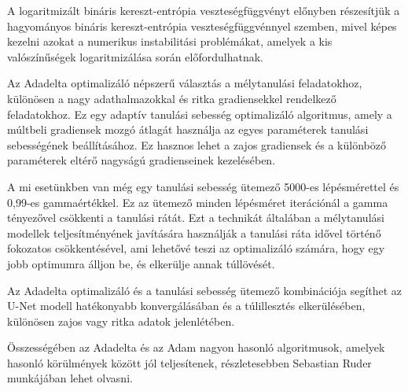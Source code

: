 \documentclass[12pt,a4]{article}
\begin{document}
        A logaritmizált bináris kereszt-entrópia veszteségfüggvényt előnyben részesítjük a hagyományos bináris kereszt-entrópia veszteségfüggvénnyel szemben, mivel képes kezelni azokat a numerikus instabilitási problémákat, amelyek a kis valószínűségek logaritmizálása során előfordulhatnak.

        Az Adadelta optimalizáló népszerű választás a mélytanulási feladatokhoz, különösen a nagy adathalmazokkal és ritka gradiensekkel rendelkező feladatokhoz. Ez egy adaptív tanulási sebesség optimalizáló algoritmus, amely a múltbeli gradiensek mozgó átlagát használja az egyes paraméterek tanulási sebességének beállításához. Ez hasznos lehet a zajos gradiensek és a különböző paraméterek eltérő nagyságú gradienseinek kezelésében.

        A mi esetünkben van még egy tanulási sebesség ütemező 5000-es lépésmérettel és 0,99-es gammaértékkel. Ez az ütemező minden lépésméret iterációnál a gamma tényezővel csökkenti a tanulási rátát. Ezt a technikát általában a mélytanulási modellek teljesítményének javítására használják a tanulási ráta idővel történő fokozatos csökkentésével, ami lehetővé teszi az optimalizáló számára, hogy egy jobb optimumra álljon be, és elkerülje annak túllövését.

        Az Adadelta optimalizáló és a tanulási sebesség ütemező kombinációja segíthet az U-Net modell hatékonyabb konvergálásában és a túlillesztés elkerülésében, különösen zajos vagy ritka adatok jelenlétében.
        
        Összességében az Adadelta és az Adam nagyon hasonló algoritmusok, amelyek hasonló körülmények között jól teljesítenek, részletesebben \cite{ruder}Sebastian Ruder munkájában lehet olvasni.
        \\
\end{document}
